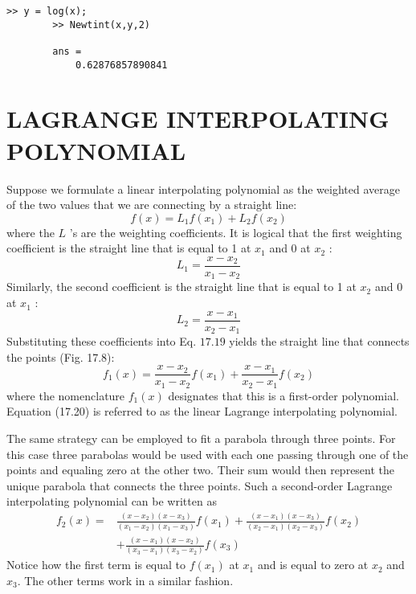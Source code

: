\documentclass[../main.tex]{subfiles}
\begin{document}
    \begin{lstlisting}[numbers=none]
        >> y = log(x);
        >> Newtint(x,y,2)

        ans =
            0.62876857890841
    \end{lstlisting}


    \section{LAGRANGE INTERPOLATING POLYNOMIAL}
    Suppose we formulate a linear interpolating polynomial as the weighted average of the two
    values that we are connecting by a straight line:
    \begin{equation}
        \tag{17.19}
    f(x)=L_{1} f\left(x_{1}\right)+L_{2} f\left(x_{2}\right)
\end{equation}
    where the $L$ 's are the weighting coefficients. It is logical that the first weighting coefficient is the straight line that is equal to 1 at $x_{1}$ and 0 at $x_{2}$ :
    $$
    L_{1}=\frac{x-x_{2}}{x_{1}-x_{2}}
    $$
    Similarly, the second coefficient is the straight line that is equal to 1 at $x_{2}$ and 0 at $x_{1}$ :
    $$
    L_{2}=\frac{x-x_{1}}{x_{2}-x_{1}}
    $$
    Substituting these coefficients into Eq. $17.19$ yields the straight line that connects the points (Fig. 17.8):
    \begin{equation}
        \tag{17.20}
    f_{1}(x)=\frac{x-x_{2}}{x_{1}-x_{2}} f\left(x_{1}\right)+\frac{x-x_{1}}{x_{2}-x_{1}} f\left(x_{2}\right)
\end{equation}
    where the nomenclature $f_{1}(x)$ designates that this is a first-order polynomial. Equation (17.20) is referred to as the linear Lagrange interpolating polynomial.
    
    The same strategy can be employed to fit a parabola through three points. For this case three parabolas would be used with each one passing through one of the points and equaling zero at the other two. Their sum would then represent the unique parabola that connects the three points. Such a second-order Lagrange interpolating polynomial can be written as
    \begin{equation}
        \tag{17.21}
    \begin{aligned}
    f_{2}(x)=& \frac{\left(x-x_{2}\right)\left(x-x_{3}\right)}{\left(x_{1}-x_{2}\right)\left(x_{1}-x_{3}\right)} f\left(x_{1}\right)+\frac{\left(x-x_{1}\right)\left(x-x_{3}\right)}{\left(x_{2}-x_{1}\right)\left(x_{2}-x_{3}\right)} f\left(x_{2}\right) \\
    &+\frac{\left(x-x_{1}\right)\left(x-x_{2}\right)}{\left(x_{3}-x_{1}\right)\left(x_{3}-x_{2}\right)} f\left(x_{3}\right)
    \end{aligned}
\end{equation}
    Notice how the first term is equal to $f\left(x_{1}\right)$ at $x_{1}$ and is equal to zero at $x_{2}$ and $x_{3}$. The other terms work in a similar fashion.
    
\end{document}
